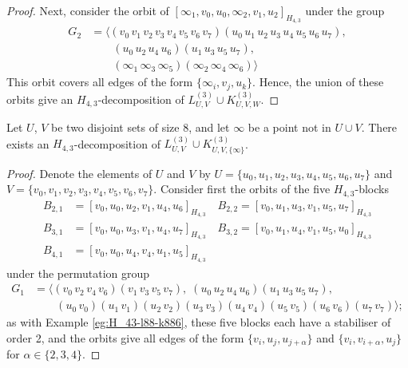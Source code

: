 \begin{subappendices}
\begin{proof}
Next, consider the orbit of $[\infty_1, v_0, u_0, \infty_2, v_1, u_2]_{H_{4,3}}$ under the group
\begin{align*}
    G_2 &= \langle
    (v_0 \, v_1 \, v_2 \, v_3 \, v_4 \, v_5 \, v_6 \, v_7)
    (u_0 \, u_1 \, u_2 \, u_3 \, u_4 \, u_5 \, u_6 \, u_7), \\
    & \quad \quad
    (u_0 \, u_2 \, u_4 \, u_6) (u_1 \, u_3 \, u_5 \, u_7), \\
    & \quad \quad
    (\infty_1 \, \infty_3 \, \infty_5) (\infty_2 \, \infty_4 \, \infty_6)
    \rangle
\end{align*}
This orbit covers all edges of the form $\{\infty_i, v_j, u_k\}$.
Hence, the union of these orbits give an $H_{4,3}$-decomposition of $L_{U,V}^{(3)} \cup K_{U,V,W}^{(3)}$.
\end{proof}



\begin{example} \label{eg:H_43-l88-k881}
Let $U$, $V$ be two disjoint sets of size 8, and let $\infty$ be a point not in $U \cup V$.
There exists an $H_{4,3}$-decomposition of $L_{U,V}^{(3)} \cup K_{U,V,\{\infty\}}^{(3)}$.
\end{example}

\begin{proof}
Denote the elements of $U$ and $V$ by $U = \{u_0, u_1, u_2, u_3, u_4, u_5, u_6, u_7\}$ and $V = \{v_0, v_1, v_2, v_3, v_4, v_5, v_6, v_7\}$.
Consider first the orbits of the five $H_{4,3}$-blocks
\begin{align*}
    B_{2,1} &= [v_0, u_0, u_2, v_1, u_4, u_6]_{H_{4,3}} \quad
    B_{2,2} = [v_0, u_1, u_3, v_1, u_5, u_7]_{H_{4,3}} \\
    B_{3,1} &= [v_0, u_0, u_3, v_1, u_4, u_7]_{H_{4,3}} \quad
    B_{3,2} = [v_0, u_1, u_4, v_1, u_5, u_0]_{H_{4,3}} \\
    B_{4,1} &= [v_0, u_0, u_4, v_4, u_1, u_5]_{H_{4,3}}
\end{align*}
under the permutation group
\begin{align*}
    G_1 &= \langle (v_0 \, v_2 \, v_4 \, v_6) (v_1 \, v_3 \, v_5 \, v_7),
    \; (u_0 \, u_2 \, u_4 \, u_6) (u_1 \, u_3 \, u_5 \, u_7), \\
    & \quad \quad (u_0 \, v_0) (u_1 \, v_1) (u_2 \, v_2) (u_3 \, v_3) (u_4 \, v_4)
    (u_5 \, v_5) (u_6 \, v_6) (u_7 \, v_7) \rangle;
\end{align*}
as with Example \ref{eg:H_43-l88-k886}, these five blocks each have a stabiliser of order 2,
  and the orbits give all edges of the form $\{v_i, u_j, u_{j+\alpha}\}$ and $\{v_i, v_{i+\alpha}, u_j\}$ for $\alpha \in \{2,3,4\}$.


\end{proof}
\end{subappendices}
